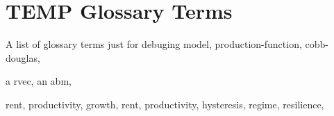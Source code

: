 \section{TEMP Glossary Terms}

A list of glossary terms just for debuging
\gls{model}, 
\gls{production-function}, 
\gls{cobb-douglas}, 

a \gls{rvec}, 
an \gls{abm}, 


\gls{rent}, 
\gls{productivity}, 
\gls{growth}, 
\gls{rent}, 
\gls{productivity}, 
\gls{hysteresis}, 
\gls{regime}, 
\gls{resilience}, 